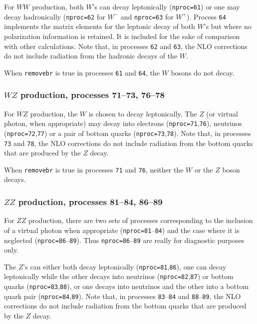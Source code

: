 \documentclass[12pt]{article}
\begin{document}
For $WW$ production, both $W$'s can decay leptonically ({\tt nproc=61}) or one
may decay hadronically ({\tt nproc=62} for $W^-$ and {\tt nproc=63} for $W^+$).
Process {\tt 64} implements the matrix elements for the leptonic decay of
both $W$'s but where no polarization information is retained. It is included
for the sake of comparison with other calculations. Note that, in processes
{\tt 62} and {\tt 63}, the NLO corrections do not include radiation from the
hadronic decays of the $W$.

When {\tt removebr} is true in processes {\tt 61} and {\tt 64},
the $W$ bosons do not decay.

\subsubsection{$WZ$ production, processes 71--73, 76--78}

For $WZ$ production, the $W$ is chosen to decay leptonically. The $Z$ (or
virtual photon, when appropriate) may decay into electrons
({\tt nproc=71},{\tt 76}), neutrinos ({\tt nproc=72},{\tt 77}) or a
pair of bottom quarks ({\tt nproc=73},{\tt 78}).
Note that, in processes
{\tt 73} and {\tt 78}, the NLO corrections do not include radiation from the
bottom quarks that are produced by the $Z$ decay.

When {\tt removebr} is true in processes {\tt 71} and {\tt 76},
neither the $W$ or the $Z$ boson decays.

\subsubsection{$ZZ$ production, processes 81--84, 86--89}

For $ZZ$ production, there are two sets of processes corresponding to the
inclusion of a virtual photon when appropriate ({\tt nproc=81}--{\tt 84})
and the case where it is neglected ({\tt nproc=86}--{\tt 89}).
Thus {\tt nproc=86}--{\tt 89} are really for diagnostic purposes only.

The $Z$'s can either both decay leptonically ({\tt nproc=81},{\tt 86}),
one can decay leptonically while the other decays into neutrinos
({\tt nproc=82},{\tt 87}) or bottom quarks ({\tt nproc=83},{\tt 88}), or
one decays into neutrinos and the other into a bottom quark pair
({\tt nproc=84},{\tt 89}).
Note that, in processes
{\tt 83}--{\tt 84} and {\tt 88}--{\tt 89}, the NLO corrections do not include
radiation from the bottom quarks that are produced by the $Z$ decay.
\end{document}
